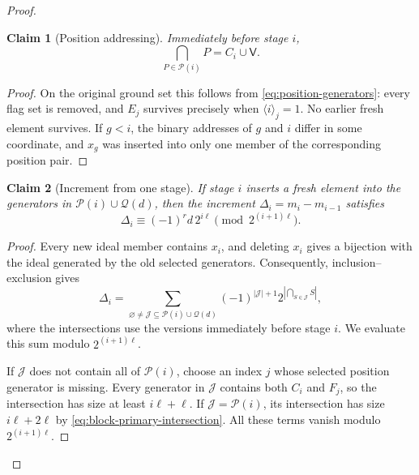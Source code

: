 \documentclass[11pt]{article}
\newtheorem{claim}[claim]{Claim}
\theoremstyle{definition}
\theoremstyle{remark}
\begin{document}
\begin{proof}
\begin{claim}[Position addressing]\label{clm:position-addressing}
Immediately before stage $i$,
\begin{equation}
  \bigcap_{P\in\mathcal P(i)}P=C_i\cup\mathsf V.
  \label{eq:block-primary-intersection}
\end{equation}
\end{claim}

\begin{proof}
On the original ground set this follows from
\eqref{eq:position-generators}: every flag set is removed, and $E_j$
survives precisely when $\langle i\rangle_j=1$.  No earlier fresh element
survives.  If $g<i$, the binary addresses of $g$ and $i$ differ in some
coordinate, and $x_g$ was inserted into only one member of the
corresponding position pair.
\end{proof}

\begin{claim}[Increment from one stage]\label{clm:block-increment}
If stage $i$ inserts a fresh element into the generators in
$\mathcal P(i)\cup\mathcal Q(d)$, then the increment
$\Delta_i=m_i-m_{i-1}$ satisfies
\begin{equation}
  \Delta_i\equiv(-1)^r d\,2^{i\ell}
  \pmod{2^{(i+1)\ell}}.
  \label{eq:block-increment-congruence}
\end{equation}
\end{claim}

\begin{proof}
Every new ideal member contains $x_i$, and deleting $x_i$ gives a
bijection with the ideal generated by the old selected generators.
Consequently, inclusion--exclusion gives
\begin{equation}
  \Delta_i=
  \sum_{\varnothing\ne\mathcal J\subseteq
             \mathcal P(i)\cup\mathcal Q(d)}
    (-1)^{|\mathcal J|+1}
    2^{|\bigcap_{S\in\mathcal J}S|},
  \label{eq:block-increment-IE}
\end{equation}
where the intersections use the versions immediately before stage $i$.
We evaluate this sum modulo $2^{(i+1)\ell}$.

If $\mathcal J$ does not contain all of $\mathcal P(i)$, choose an
index $j$ whose selected position generator is missing.  Every generator
in $\mathcal J$ contains both $C_i$ and $F_j$, so the intersection has
size at least $i\ell+\ell$.  If $\mathcal J=\mathcal P(i)$, its
intersection has size $i\ell+2\ell$ by
\eqref{eq:block-primary-intersection}.  All these terms vanish modulo
$2^{(i+1)\ell}$.


\end{proof}
\end{proof}
\end{document}
